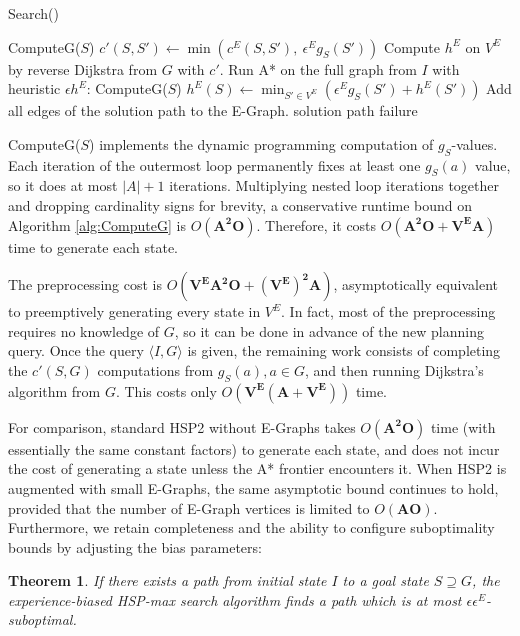 \documentclass[letterpaper]{article}
\newtheorem{thm}{Theorem}
\begin{document}
\begin{algorithm}
\caption{Search()}
\label{alg:Search}
\begin{algorithmic}
\STATE ComputeG($S$)
\STATE $c'(S,S') \leftarrow \min\left(c^E(S,S'),~\epsilon^E g_S(S')\right)$
\ENDFOR
\ENDFOR
\STATE Compute $h^E$ on $V^E$ by reverse Dijkstra from $G$ with $c'$.
\STATE Run A* on the full graph from $I$ with heuristic $\epsilon h^E$:
\STATE ComputeG($S$)
\STATE $h^E(S) \leftarrow \min_{S'\in V^E} \left( \epsilon^E g_S(S') + h^E(S') \right)$
\ENDFOR
{}
\STATE Add all edges of the solution path to the E-Graph.
\RETURN solution path
\ELSE
\RETURN failure
\ENDIF
\end{algorithmic}
\end{algorithm}

ComputeG($S$) implements the dynamic programming computation of $g_S$-values.
Each iteration of the outermost loop permanently fixes at least one $g_S(a)$ value, so it does at most $|A|+1$ iterations.
Multiplying nested loop iterations together and dropping cardinality signs for brevity, a conservative runtime bound on Algorithm \ref{alg:ComputeG} is $O(\mathbf{A^2O})$.
Therefore, it costs $O(\mathbf{A^2O + V^EA})$ time to generate each state.

The preprocessing cost is $O(\mathbf{V^EA^2O + (V^E)^2A})$, asymptotically equivalent to preemptively generating every state in $V^E$.
In fact, most of the preprocessing requires no knowledge of $G$, so it can be done in advance of the new planning query. Once the query $\langle I,G\rangle$ is given, the remaining work consists of completing the $c'(S,G)$ computations from $g_S(a),a\in G$, and then running Dijkstra's algorithm from $G$. This costs only $O(\mathbf{V^E(A + V^E)})$ time.

For comparison, standard HSP2 without E-Graphs takes $O(\mathbf{A^2O})$ time (with essentially the same constant factors) to generate each state, and does not incur the cost of generating a state unless the A* frontier encounters it.
When HSP2 is augmented with small E-Graphs, the same asymptotic bound continues to hold, provided that the number of E-Graph vertices is limited to $O(\mathbf{AO})$. Furthermore, we retain completeness and the ability to configure suboptimality bounds by adjusting the bias parameters:

\begin{thm}
If there exists a path from initial state $I$ to a goal state $S\supseteq G$, the experience-biased HSP-max search algorithm finds a path which is at most $\epsilon\epsilon^E$-suboptimal.
\end{thm}
\end{document}

